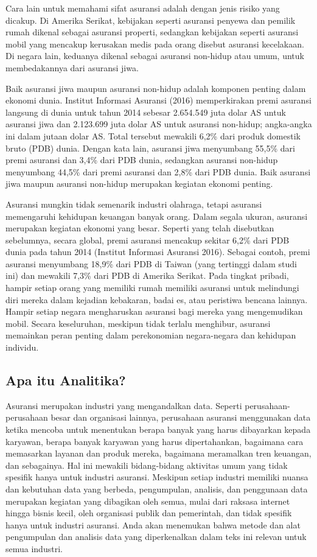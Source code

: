 \documentclass[
]{book}
\begin{document}
Cara lain untuk memahami sifat asuransi adalah dengan jenis risiko yang dicakup. Di Amerika Serikat, kebijakan seperti asuransi penyewa dan pemilik rumah dikenal sebagai asuransi properti, sedangkan kebijakan seperti asuransi mobil yang mencakup kerusakan medis pada orang disebut asuransi kecelakaan. Di negara lain, keduanya dikenal sebagai asuransi non-hidup atau umum, untuk membedakannya dari asuransi jiwa.

Baik asuransi jiwa maupun asuransi non-hidup adalah komponen penting dalam ekonomi dunia. Institut Informasi Asuransi (2016) memperkirakan premi asuransi langsung di dunia untuk tahun 2014 sebesar 2.654.549 juta dolar AS untuk asuransi jiwa dan 2.123.699 juta dolar AS untuk asuransi non-hidup; angka-angka ini dalam jutaan dolar AS. Total tersebut mewakili 6,2\% dari produk domestik bruto (PDB) dunia. Dengan kata lain, asuransi jiwa menyumbang 55,5\% dari premi asuransi dan 3,4\% dari PDB dunia, sedangkan asuransi non-hidup menyumbang 44,5\% dari premi asuransi dan 2,8\% dari PDB dunia. Baik asuransi jiwa maupun asuransi non-hidup merupakan kegiatan ekonomi penting.

Asuransi mungkin tidak semenarik industri olahraga, tetapi asuransi memengaruhi kehidupan keuangan banyak orang. Dalam segala ukuran, asuransi merupakan kegiatan ekonomi yang besar. Seperti yang telah disebutkan sebelumnya, secara global, premi asuransi mencakup sekitar 6,2\% dari PDB dunia pada tahun 2014 (Institut Informasi Asuransi 2016). Sebagai contoh, premi asuransi menyumbang 18,9\% dari PDB di Taiwan (yang tertinggi dalam studi ini) dan mewakili 7,3\% dari PDB di Amerika Serikat. Pada tingkat pribadi, hampir setiap orang yang memiliki rumah memiliki asuransi untuk melindungi diri mereka dalam kejadian kebakaran, badai es, atau peristiwa bencana lainnya. Hampir setiap negara mengharuskan asuransi bagi mereka yang mengemudikan mobil. Secara keseluruhan, meskipun tidak terlalu menghibur, asuransi memainkan peran penting dalam perekonomian negara-negara dan kehidupan individu.

\hypertarget{apa-itu-analitika}{%
\subsection{Apa itu Analitika?}\label{apa-itu-analitika}}

Asuransi merupakan industri yang mengandalkan data. Seperti perusahaan-perusahaan besar dan organisasi lainnya, perusahaan asuransi menggunakan data ketika mencoba untuk menentukan berapa banyak yang harus dibayarkan kepada karyawan, berapa banyak karyawan yang harus dipertahankan, bagaimana cara memasarkan layanan dan produk mereka, bagaimana meramalkan tren keuangan, dan sebagainya. Hal ini mewakili bidang-bidang aktivitas umum yang tidak spesifik hanya untuk industri asuransi. Meskipun setiap industri memiliki nuansa dan kebutuhan data yang berbeda, pengumpulan, analisis, dan penggunaan data merupakan kegiatan yang dibagikan oleh semua, mulai dari raksasa internet hingga bisnis kecil, oleh organisasi publik dan pemerintah, dan tidak spesifik hanya untuk industri asuransi. Anda akan menemukan bahwa metode dan alat pengumpulan dan analisis data yang diperkenalkan dalam teks ini relevan untuk semua industri.
\end{document}
